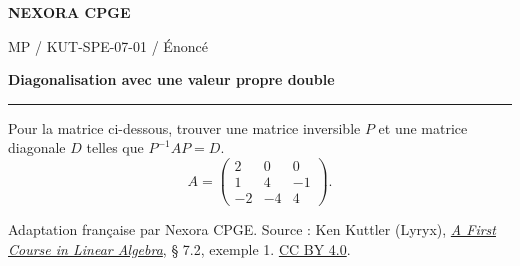 \documentclass[11pt,a4paper]{article}
\begin{document}
{\small\bfseries\color{nexorablue} NEXORA CPGE}\par
{\small MP / KUT-SPE-07-01 / Énoncé}\par
{\LARGE\bfseries Diagonalisation avec une valeur propre double}\par
\vspace{0.25em}\hrule\vspace{0.6em}

Pour la matrice ci-dessous, trouver une matrice inversible $P$ et une matrice diagonale $D$ telles que $P^{-1}AP=D$.
\[ A=\begin{pmatrix}2&0&0\\1&4&-1\\-2&-4&4\end{pmatrix}. \]

\bigskip
{\footnotesize Adaptation française par Nexora CPGE. Source : Ken Kuttler (Lyryx),
\href{https://math.libretexts.org/Bookshelves/Linear_Algebra/A_First_Course_in_Linear_Algebra_(Kuttler)/07\%253A_Spectral_Theory/7.02\%253A_Diagonalization}{\textit{A First Course in Linear Algebra}}, § 7.2, exemple 1.
\href{https://creativecommons.org/licenses/by/4.0/}{CC BY 4.0}.}
\end{document}
